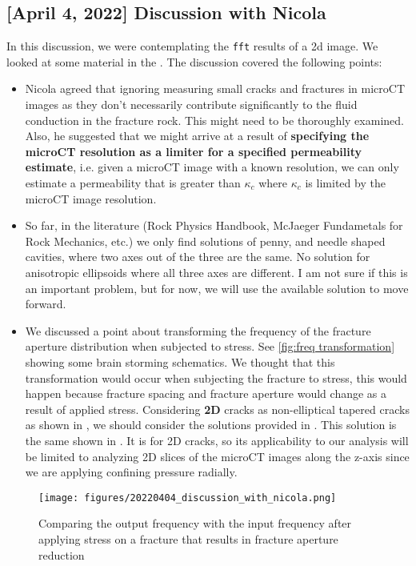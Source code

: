 \documentclass[11pt,titlepage]{article}
\begin{document}
\subsection{[April 4, 2022] Discussion with Nicola}
In this discussion, we were contemplating the \texttt{fft} results of a 2d image. We looked at some material in the \cite[see pages 63-66]{Mavko2009}. The discussion covered the following points: 
\begin{itemize}
\item Nicola agreed that ignoring measuring small cracks and fractures in microCT images as they don't necessarily contribute significantly to the fluid conduction in the fracture rock. This might need to be thoroughly examined. Also, he suggested that we might arrive at a result of \textbf{specifying the microCT resolution as a limiter for a specified permeability estimate}, i.e. given a microCT image with a known resolution, we can only estimate a permeability that is greater than $\kappa_c$ where $\kappa_c$ is limited by the microCT image resolution.
\item So far, in the literature (Rock Physics Handbook, McJaeger Fundametals for Rock Mechanics, etc.) we only find solutions of penny, and needle shaped cavities, where two axes out of the three are the same. No solution for anisotropic ellipsoids where all three axes are different. I am not sure if this is an important problem, but for now, we will use the available solution to move forward.
\item We discussed a point about transforming the frequency of the fracture aperture distribution when subjected to stress. See \autoref{fig:freq transformation} showing some brain storming schematics. We thought that this transformation would occur when subjecting the fracture to stress, this would happen because fracture spacing and fracture aperture would change as a result of applied stress. Considering \textbf{2D} cracks as non-elliptical tapered cracks as shown in \cite[Table 2.9.1 page 64, and Figure 2.9.2 page 66]{Mavko2009}, we should consider the solutions provided in \cite{Mavko1978}. This solution is the same shown in \cite[see pages 63-66]{Mavko2009}. It is for 2D cracks, so its applicability to our analysis will be limited to analyzing 2D slices of the microCT images along the z-axis since we are applying confining pressure radially.

\end{itemize}

\begin{figure}
\centering
\texttt{[image: figures/20220404\_discussion\_with\_nicola.png]}
\caption{Comparing the output frequency with the input frequency after applying stress on a fracture that results in fracture aperture reduction}
\label{fig:freq transformation}
\end{figure}
\end{document}
